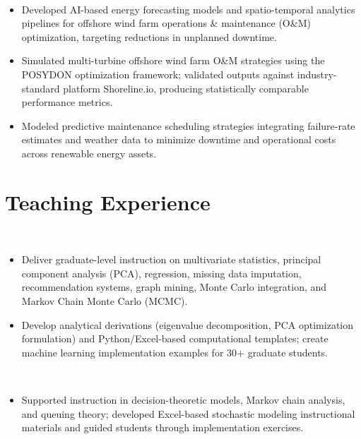 \documentclass[10pt, letterpaper]{article}
\begin{document}
\\
\begin{itemize}
  \item Developed AI-based energy forecasting models and spatio-temporal analytics pipelines for offshore wind farm operations \& maintenance (O\&M) optimization, targeting reductions in unplanned downtime.
  \item Simulated multi-turbine offshore wind farm O\&M strategies using the POSYDON optimization framework; validated outputs against industry-standard platform Shoreline.io, producing statistically comparable performance metrics.
  \item Modeled predictive maintenance scheduling strategies integrating failure-rate estimates and weather data to minimize downtime and operational costs across renewable energy assets.
\end{itemize}

\vspace{1pt}

\section{Teaching Experience}

\\
\begin{itemize}
  \item Deliver graduate-level instruction on multivariate statistics, principal component analysis (PCA), regression, missing data imputation, recommendation systems, graph mining, Monte Carlo integration, and Markov Chain Monte Carlo (MCMC).
  \item Develop analytical derivations (eigenvalue decomposition, PCA optimization formulation) and Python/Excel-based computational templates; create machine learning implementation examples for 30$+$ graduate students.
\end{itemize}

\entrysep

\\
\begin{itemize}
  \item Supported instruction in decision-theoretic models, Markov chain analysis, and queuing theory; developed Excel-based stochastic modeling instructional materials and guided students through implementation exercises.
\end{itemize}
\end{document}
